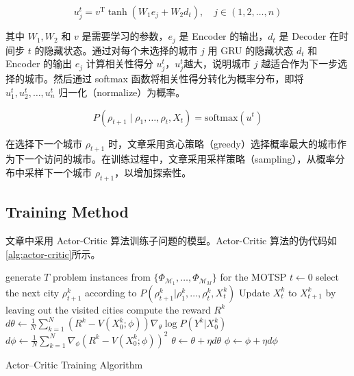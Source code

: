 \documentclass[fontset=none]{ctexart}
\begin{document}
\begin{equation}
    u_j^t = v^\mathrm{T} \tanh(W_1 e_j + W_2 d_t), \quad j \in (1, 2, \ldots, n)\label{eq:attention}
\end{equation}

其中 $W_1, W_2$ 和 $v$ 是需要学习的参数，$e_j$ 是 Encoder 的输出，$d_t$ 是 Decoder 在时间步 $t$ 的隐藏状态。通过对每个未选择的城市 $j$ 用 GRU 的隐藏状态 $d_t$ 和 Encoder 的输出 $e_j$ 计算相关性得分 $u_j^t$，$u_j^t$越大，说明城市 $j$ 越适合作为下一步选择的城市。然后通过 softmax 函数将相关性得分转化为概率分布，即将 $u_1^t, u_2^t, \ldots, u_n^t$ 归一化（normalize）为概率。

\begin{equation}
    P(\rho_{t + 1} \mid \rho_1, \ldots, \rho_t, X_t) = \text{softmax}(u^t)\label{eq:softmax}
\end{equation}

在选择下一个城市 $\rho_{t + 1}$ 时，文章采用贪心策略（greedy）选择概率最大的城市作为下一个访问的城市。在训练过程中，文章采用采样策略（sampling），从概率分布中采样下一个城市 $\rho_{t + 1}$，以增加探索性。

\subsection{Training Method}

文章中采用 Actor-Critic 算法训练子问题的模型\cite{nazariReinforcementLearningSolving2018, belloNeuralCombinatorialOptimization2017}。Actor-Critic 算法的伪代码如\cref{alg:actor-critic}所示。

\begin{algorithm}[H]
    \SetAlgoLined
    \SetNoFillComment
    \vspace{3mm}
     {
        generate $T$ problem instances from $\{\Phi_{\mathcal{M}_1}, \dots, \Phi_{\mathcal{M}_M}\}$ for the MOTSP\;
         {
            $t \leftarrow 0$\;
             {
                select the next city $\rho_{t+1}^k$ according to $P(\rho_{t+1}^k | \rho_1^k, \dots, \rho_t^k, X_t^k)$\;
                Update $X_t^k$ to $X_{t+1}^k$ by leaving out the visited cities\;
            }
            compute the reward $R^k$\;
        }
        $d\theta \leftarrow \frac{1}{N} \sum_{k=1}^N \left( R^k - V(X_0^k; \phi) \right) \nabla_\theta \log P(Y^k | X_0^k)$\;
        $d\phi \leftarrow \frac{1}{N} \sum_{k=1}^N \nabla_\phi \left( R^k - V(X_0^k; \phi) \right)^2$\;
        $\theta \leftarrow \theta + \eta d\theta$\;
        $\phi \leftarrow \phi + \eta d\phi$\;
    }
    \caption{Actor--Critic Training Algorithm}
    \label{alg:actor-critic}
\end{algorithm}
\end{document}
